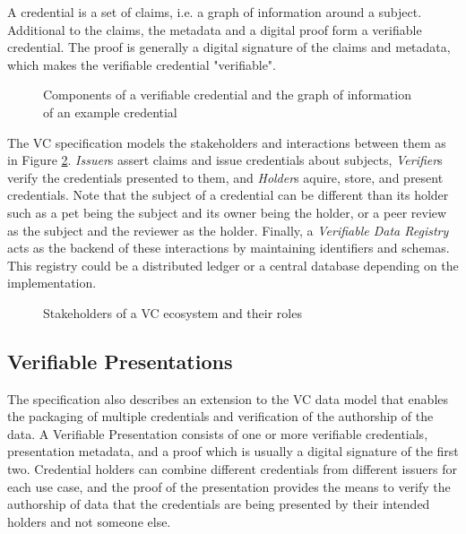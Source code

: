 A credential is a set of claims, i.e. a graph of information around a subject. Additional to the claims, the metadata and a digital proof form a verifiable credential. The proof is generally a digital signature of the claims and metadata, which makes the verifiable credential "verifiable".

\begin{figure}[htbp]
  \centering
  
  
  \caption{Components of a verifiable credential and the graph of information of an example credential \parencite{Sporny.18Kas2019}} \label{fig:credentialGraph}
\end{figure}

The \acrshort{VC} specification models the stakeholders and interactions between them as in Figure \ref{fig:ecosystem}. \textit{Issuer}s assert claims and issue credentials about subjects, \textit{Verifier}s verify the credentials presented to them, and \textit{Holder}s aquire, store, and present credentials. Note that the subject of a credential can be different than its holder such as a pet being the subject and its owner being the holder, or a peer review as the subject and the reviewer as the holder. Finally, a \textit{Verifiable Data Registry} acts as the backend of these interactions by maintaining identifiers and schemas. This registry could be a distributed ledger or a central database depending on the implementation.

\begin{figure}[htbp]
  \centering
  
  \caption{Stakeholders of a \acrlong{VC} ecosystem and their roles \parencite{Sporny.18Kas2019}} \label{fig:ecosystem}
\end{figure}

\subsection{Verifiable Presentations}

The specification also describes an extension to the \acrshort{VC} data model that enables the packaging of multiple credentials and verification of the authorship of the data. A Verifiable Presentation consists of one or more verifiable credentials, presentation metadata, and a proof which is usually a digital signature of the first two. Credential holders can combine different credentials from different issuers for each use case, and the proof of the presentation provides the means to verify the authorship of data that the credentials are being presented by their intended holders and not someone else.

